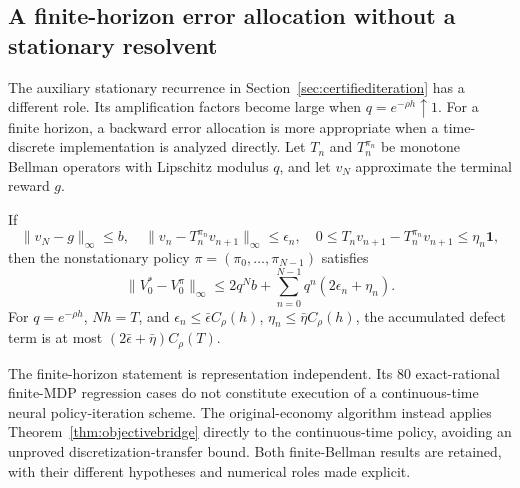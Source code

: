 \subsection{A finite-horizon error allocation without a stationary resolvent}
The auxiliary stationary recurrence in Section~\ref{sec:certifiediteration} has a different role. Its amplification factors become large when $q=e^{-\rho h}\uparrow1$. For a finite horizon, a backward error allocation is more appropriate when a time-discrete implementation is analyzed directly. Let $T_n$ and $T_n^{\pi_n}$ be monotone Bellman operators with Lipschitz modulus $q$, and let $v_N$ approximate the terminal reward $g$.

\begin{proposition}\label{prop:finitehorizon}
If
\[
 \|v_N-g\|_\infty\leq b,\quad
 \|v_n-T_n^{\pi_n}v_{n+1}\|_\infty\leq\epsilon_n,\quad
 0\leq T_nv_{n+1}-T_n^{\pi_n}v_{n+1}\leq\eta_n\mathbf1,
\]
then the nonstationary policy $\pi=(\pi_0,\ldots,\pi_{N-1})$ satisfies
\begin{equation}
 \|V_0^*-V_0^\pi\|_\infty
 \leq 2q^Nb+\sum_{n=0}^{N-1}q^n(2\epsilon_n+\eta_n).\label{eq:finitehorizon}
\end{equation}
For $q=e^{-\rho h}$, $Nh=T$, and $\epsilon_n\leq\bar\epsilon C_\rho(h)$, $\eta_n\leq\bar\eta C_\rho(h)$, the accumulated defect term is at most $(2\bar\epsilon+\bar\eta)C_\rho(T)$.
\end{proposition}
The finite-horizon statement is representation independent. Its 80 exact-rational finite-MDP regression cases do not constitute execution of a continuous-time neural policy-iteration scheme. The original-economy algorithm instead applies Theorem~\ref{thm:objectivebridge} directly to the continuous-time policy, avoiding an unproved discretization-transfer bound. Both finite-Bellman results are retained, with their different hypotheses and numerical roles made explicit.

